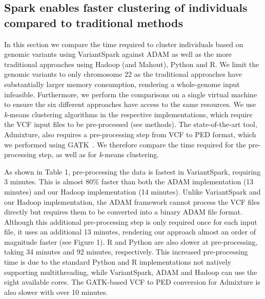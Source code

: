 \documentclass{bmcart}
\newcommand{\variantSpark}{{\sc VariantSpark}}
\newcommand{\kMeans}{\textit{k}-means}
\begin{document}
\subsection*{{\sc Spark} enables faster clustering of individuals compared to traditional methods}

In this section we compare the time required to cluster individuals based on genomic variants using \variantSpark{} against {\sc ADAM} as well as the more traditional approaches using Hadoop (and Mahout), Python and R. 
We limit the genomic variants to only chromosome 22 as the traditional approaches have substantially larger memory consumption, rendering a whole-genome input infeasible.
Furthermore, we perform the comparisons on a single virtual machine to ensure the six different approaches have access to the same resources.
We use \kMeans{} clustering algorithms in the respective implementations, which require the VCF input files to be pre-processed (see methods). 
The state-of-the-art tool, {\sc Admixture}, also requires a pre-processing step from VCF to PED format, which we performed using GATK~\cite{McKenna2010}.
We therefore compare the time required for the pre-processing step, as well as for \kMeans{} clustering.

As shown in Table 1, pre-processing the data is fastest in \variantSpark{}, requiring 3 minutes. %
This is almost 80\% faster than both the {\sc ADAM} implementation (13 minutes) %
and our Hadoop implementation (14 minutes). %
Unlike \variantSpark{} and our Hadoop implementation, the {\sc ADAM} framework cannot process the VCF files directly but requires them to be converted into a binary {\sc ADAM} file format. 
Although this additional pre-processing step is only required once for each input file, it uses an additional 13 minutes, %
rendering our approach almost an order of magnitude faster (see Figure 1).
R and Python are also slower at pre-processing, taking 34 minutes and 92 minutes, respectively. %
This increased pre-processing time is due to the standard Python and R implementations not natively supporting multithreading, while \variantSpark{}, {\sc ADAM} and Hadoop can use the eight available cores.
The GATK-based VCF to PED conversion for {\sc Admixture} is also slower with over 10 minutes. 
\end{document}
